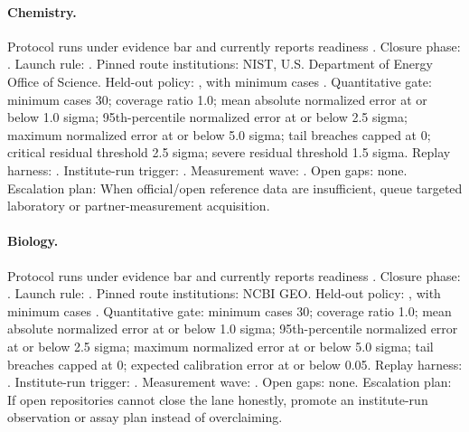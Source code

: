 \paragraph{Chemistry.}
Protocol  runs under evidence bar  and currently reports readiness .
Closure phase: . Launch rule: .
Pinned route institutions: NIST, \allowbreak U.S. Department of Energy Office of Science.
Held-out policy: , with minimum cases .
Quantitative gate: minimum cases 30; coverage ratio 1.0; mean absolute normalized error at or below 1.0 sigma; 95th-percentile normalized error at or below 2.5 sigma; maximum normalized error at or below 5.0 sigma; tail breaches capped at 0; critical residual threshold 2.5 sigma; severe residual threshold 1.5 sigma.
Replay harness: .
Institute-run trigger: . Measurement wave: .
Open gaps: none.
Escalation plan: When official/open reference data are insufficient, queue targeted laboratory or partner-measurement acquisition.

\paragraph{Biology.}
Protocol  runs under evidence bar  and currently reports readiness .
Closure phase: . Launch rule: .
Pinned route institutions: NCBI GEO.
Held-out policy: , with minimum cases .
Quantitative gate: minimum cases 30; coverage ratio 1.0; mean absolute normalized error at or below 1.0 sigma; 95th-percentile normalized error at or below 2.5 sigma; maximum normalized error at or below 5.0 sigma; tail breaches capped at 0; expected calibration error at or below 0.05.
Replay harness: .
Institute-run trigger: . Measurement wave: .
Open gaps: none.
Escalation plan: If open repositories cannot close the lane honestly, promote an institute-run observation or assay plan instead of overclaiming.

